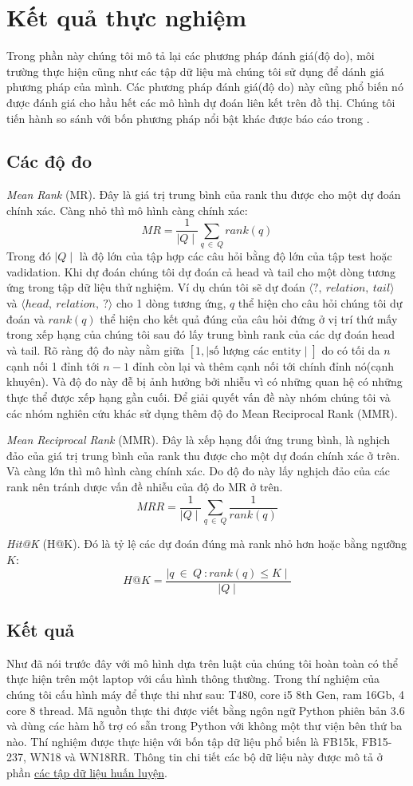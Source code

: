 \section{Kết quả thực nghiệm}
Trong phần này chúng tôi mô tả lại các phương pháp đánh giá(độ do), môi trường thực hiện cũng như các tập dữ liệu mà chúng tôi sử dụng để dánh giá phương pháp của mình. Các phương pháp đánh giá(độ do) này cũng phổ biến nó được đánh giá cho hầu hết các mô hình dự đoán liên kết trên đồ thị. Chúng tôi tiến hành so sánh với bốn phương pháp nổi bật khác được báo cáo trong \cite{rossi2020knowledge}.
\subsection{Các độ đo}
\textit{Mean Rank} (MR). Đây là giá trị trung bình của rank thu được cho một dự đoán chính xác. Càng nhỏ thì mô hình càng chính xác:
\[MR = \frac{1}{\mid Q \mid} \sum_{q ~\in~ Q} rank(q) \]
Trong đó \(\mid Q \mid\) là độ lớn của tập hợp các câu hỏi bằng độ lớn của tập test hoặc vadidation. Khi dự đoán chúng tôi dự đoán cả head và tail cho một dòng tương ứng trong tập dữ liệu thử nghiệm. Ví dụ chún tôi sẽ dự đoán \(\langle ?,~ relation,~ tail \rangle\) và \(\langle head,~ relation,~ ?\rangle\) cho 1 dòng tương ứng, \(q\) thể hiện cho câu hỏi chúng tôi dự đoán và \(rank(q)\) thể hiện cho kết quả đúng của câu hỏi đứng ở vị trí thứ mấy trong xếp hạng của chúng tôi sau đó lấy trung bình rank của các dự đoán head và tail. Rõ ràng độ đo này nằm giữa \([1, \mid \text{số lượng các entity} \mid]\) do có tối da \(n\) cạnh nối 1 đỉnh tới \(n-1\) đỉnh còn lại và thêm cạnh nối tới chính đỉnh nó(cạnh khuyên). Và độ đo này đễ bị ảnh hưởng bởi nhiễu vì có những quan hệ có những thực thể được xếp hạng gần cuối. Để giải quyết vấn đề này nhóm chúng tôi và các nhóm nghiên cứu khác sử dụng thêm độ đo Mean Reciprocal Rank (MMR).

\textit{Mean Reciprocal Rank} (MMR). Đây là xếp hạng đối ứng trung bình, là nghịch đảo của giá trị trung bình của rank thu được cho một dự đoán chính xác ở trên. Và càng lớn thì mô hình càng chính xác. Do độ đo này lấy nghịch đảo của các rank nên tránh dược vấn đề nhiễu của độ đo MR ở trên.
\[MRR =\frac{1}{\mid Q \mid} \sum_{q~ \in ~Q} \frac{1}{rank(q)}\]

\textit{Hit@K} (H@K). Đó là tỷ lệ các dự đoán đúng mà rank nhỏ hơn hoặc bằng ngưỡng \(K\):
\[H@K = \frac{\mid {q ~\in ~Q~: rank(q) \leq K} \mid}{\mid Q \mid}\]
\subsection{Kết quả}
Như đã nói trước đây với mô hình dựa trên luật của chúng tôi hoàn toàn có thể thực hiện trên một laptop với cấu hình thông thường. Trong thí nghiệm của chúng tôi cấu hình máy để thực thi như sau: T480, core i5 8th Gen, ram 16Gb, 4 core 8 thread. Mã nguồn thực thi được viết bằng ngôn ngữ Python phiên bản 3.6 và dùng các hàm hỗ trợ có sẵn trong Python với không một thư viện bên thứ ba nào. Thí nghiệm được thực hiện với bốn tập dữ liệu phổ biến là FB15k, FB15-237, WN18 và WN18RR. Thông tin chi tiết các bộ dữ liệu này được mô tả ở phần \hyperref[datasets]{các tập dữ liệu huấn luyện}.

